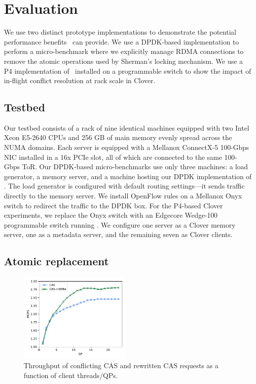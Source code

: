 \section{Evaluation}
\label{s:results}

We use two distinct prototype implementations to demonstrate the
potential performance benefits \sword\ can provide.  We use a
DPDK-based implementation to perform a micro-benchmark where we
explicitly manage RDMA connections to remove the atomic operations
used by Sherman's locking mechanism.  We use a P4 implementation of
\sword\ installed on a programmable switch to show the impact of
in-flight conflict resolution at rack scale in Clover.


\subsection{Testbed} 

Our testbed consists of a rack of nine identical machines equipped
with two Intel Xeon E5-2640 CPUs and 256 GB of main memory evenly
spread across the NUMA domains. Each server is equipped with a
Mellanox ConnectX-5 100-Gbps NIC installed in a 16x PCIe slot, all of
which are connected to the same 100-Gbps ToR.  Our DPDK-based
micro-benchmarks use only three machines: a load generator, a memory
server, and a machine hosting our DPDK implementation of {\sword}.
The load generator is configured with default routing settings---it
sends traffic directly to the memory server.  We install OpenFlow
rules on a Mellanox Onyx switch to redirect the traffic to the DPDK
box.  For the P4-based Clover experiments, we replace the Onyx switch
with an Edgecore Wedge-100 programmable switch running \sword.
We configure one server as a Clover memory server, one as a metadata
server, and the remaining seven as Clover clients.

\subsection{Atomic replacement}

\begin{figure}[t]
    \includegraphics[width=0.485\textwidth]{fig/cas_vs_swap.pdf}
    \caption{Throughput of conflicting CAS and rewritten CAS requests as a function of client threads/QPs.}
    \label{fig:cas_vs_swap}
\end{figure}

